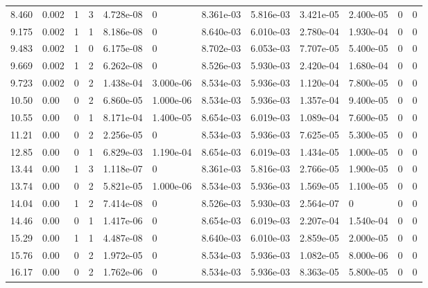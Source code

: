 \documentclass[preview]{standalone}
\begin{document}
{{\begin{tabular}{L{1.2cm}C{1.2cm} C{0.3cm}C{0.5cm} C{1.4cm}C{1.4cm} C{1.4cm}C{1.4cm} C{1.6cm}C{1.6cm} C{1.6cm}C{1.6cm}}
  8.460  &  0.002  & 1     &  3 &  4.728e-08  & 0  &  8.361e-03&   5.816e-03& 3.421e-05 & 2.400e-05   &  0 & 0  \\ 
  9.175  &  0.002  & 1     &  1 &  8.186e-08  & 0  &  8.640e-03&   6.010e-03& 2.780e-04 & 1.930e-04   &  0 & 0  \\ 
  9.483  &  0.002  & 1     &  0 &  6.175e-08  & 0  &  8.702e-03&   6.053e-03& 7.707e-05 & 5.400e-05   &  0 & 0  \\ 
  9.669  &  0.002  & 1     &  2 &  6.262e-08  & 0  &  8.526e-03&   5.930e-03& 2.420e-04 & 1.680e-04   &  0 & 0  \\ 
  9.723  &  0.002  & 0     &  2 &  1.438e-04  & 3.000e-06  &  8.534e-03&   5.936e-03& 1.120e-04 & 7.800e-05   &  0 & 0  \\ 
  10.50  &  0.00  & 0     &  2 &  6.860e-05  & 1.000e-06  &  8.534e-03&   5.936e-03& 1.357e-04 & 9.400e-05   &  0 & 0  \\ 
  10.55  &  0.00  & 0     &  1 &  8.171e-04  & 1.400e-05  &  8.654e-03&   6.019e-03& 1.089e-04 & 7.600e-05   &  0 & 0  \\ 
  11.21  &  0.00  & 0     &  2 &  2.256e-05  & 0  &  8.534e-03&   5.936e-03& 7.625e-05 & 5.300e-05   &  0 & 0  \\ 
  12.85  &  0.00  & 0     &  1 &  6.829e-03  & 1.190e-04  &  8.654e-03&   6.019e-03& 1.434e-05 & 1.000e-05   &  0 & 0  \\ 
  13.44  &  0.00  & 1     &  3 &  1.118e-07  & 0  &  8.361e-03&   5.816e-03& 2.766e-05 & 1.900e-05   &  0 & 0  \\ 
  13.74  &  0.00  & 0     &  2 &  5.821e-05  & 1.000e-06  &  8.534e-03&   5.936e-03& 1.569e-05 & 1.100e-05   &  0 & 0  \\ 
  14.04  &  0.00  & 1     &  2 &  7.414e-08  & 0  &  8.526e-03&   5.930e-03& 2.564e-07 & 0   &  0 & 0  \\ 
  14.46  &  0.00  & 0     &  1 &  1.417e-06  & 0  &  8.654e-03&   6.019e-03& 2.207e-04 & 1.540e-04   &  0 & 0  \\ 
  15.29  &  0.00  & 1     &  1 &  4.487e-08  & 0  &  8.640e-03&   6.010e-03& 2.859e-05 & 2.000e-05   &  0 & 0  \\ 
  15.76  &  0.00  & 0     &  2 &  1.972e-05  & 0  &  8.534e-03&   5.936e-03& 1.082e-05 & 8.000e-06   &  0 & 0  \\ 
  16.17  &  0.00  & 0     &  2 &  1.762e-06  & 0  &  8.534e-03&   5.936e-03& 8.363e-05 & 5.800e-05   &  0 & 0  \\ 
\hline 
\end{tabular} 

}}
\end{document}
